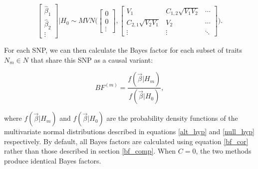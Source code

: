 \documentclass{article}
\begin{document}
\begin{equation}
\label{null_hyp}
\begin{bmatrix}
\hat{\beta}_1 \\
\hat{\beta}_2 \\
\vdots
\end{bmatrix} | H_0
\sim MVN \Bigg(
\begin{bmatrix}
0 \\
0 \\
\vdots
\end{bmatrix},
\begin{bmatrix}
V_1 & C_{1,2} \sqrt{V_1 V_2} & \cdots \\
C_{2,1} \sqrt{V_2 V_1} & V_2 & \cdots \\
\vdots & \vdots & \ddots
\end{bmatrix}
\Bigg).
\end{equation}


\noindent For each SNP, we can then calculate the Bayes factor for each subset of traits $N_m \in N$ that share this SNP as a causal variant:

\begin{equation}
\label{bf_cor}
BF^{(m)} = \frac{f(\vec{\beta}| H_m)}{f(\vec{\beta}| H_0)},
\end{equation}

\noindent where $f(\vec{\beta}| H_m)$ and $f(\vec{\beta}| H_0)$ are the probability density functions of the multivariate normal distributions described in equations \ref{alt_hyp} and \ref{null_hyp} respectively. By default, all Bayes factors are calculated using equation \ref{bf_cor} rather than those described in section \ref{bf_comp}. When $C = 0$, the two methods produce identical Bayes factors.




\end{document}
